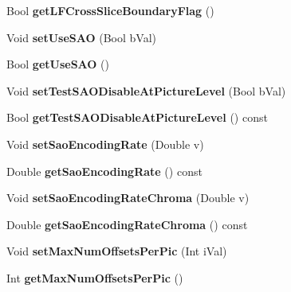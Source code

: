 \begin{DoxyCompactItemize}
\mbox{\label{class_t_enc_cfg_a923e68f94533b3629ad426ce3eade5e4}} 
Bool {\bfseries get\+L\+F\+Cross\+Slice\+Boundary\+Flag} ()
\item 
\mbox{\label{class_t_enc_cfg_ae961c5958c92d8454e206875d588f9ab}} 
Void {\bfseries set\+Use\+S\+AO} (Bool b\+Val)
\item 
\mbox{\label{class_t_enc_cfg_a87f0646194f6598172fab9d52944dd98}} 
Bool {\bfseries get\+Use\+S\+AO} ()
\item 
\mbox{\label{class_t_enc_cfg_a4b6f33f5cb0765ae23395036e8cda81e}} 
Void {\bfseries set\+Test\+S\+A\+O\+Disable\+At\+Picture\+Level} (Bool b\+Val)
\item 
\mbox{\label{class_t_enc_cfg_a47bb05c11a17b79161b5ed243ced86a2}} 
Bool {\bfseries get\+Test\+S\+A\+O\+Disable\+At\+Picture\+Level} () const
\item 
\mbox{\label{class_t_enc_cfg_ad45ba7da6ff8e8a46fb5f47b3a1de983}} 
Void {\bfseries set\+Sao\+Encoding\+Rate} (Double v)
\item 
\mbox{\label{class_t_enc_cfg_a9422040cc00c2c12b2a28aaa885b9b36}} 
Double {\bfseries get\+Sao\+Encoding\+Rate} () const
\item 
\mbox{\label{class_t_enc_cfg_a38c6a2d14013ccbbd63ff1d6acce42e3}} 
Void {\bfseries set\+Sao\+Encoding\+Rate\+Chroma} (Double v)
\item 
\mbox{\label{class_t_enc_cfg_ae6841a8e5da7ddfd6efadd7c69007ea7}} 
Double {\bfseries get\+Sao\+Encoding\+Rate\+Chroma} () const
\item 
\mbox{\label{class_t_enc_cfg_ac4e7c35999ada186a4d6502ef378be53}} 
Void {\bfseries set\+Max\+Num\+Offsets\+Per\+Pic} (Int i\+Val)
\item 
\mbox{\label{class_t_enc_cfg_a7ad898d78dab9953bf30cb0f529a0655}} 
Int {\bfseries get\+Max\+Num\+Offsets\+Per\+Pic} ()
\item 
\mbox{\label{class_t_enc_cfg_a3f30af69cf4ea59360557838869e8349}} 

\end{DoxyCompactItemize}
